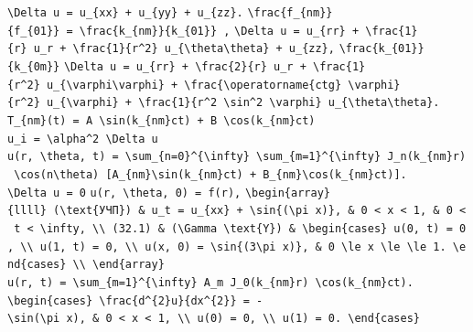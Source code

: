 \documentclass[
  ukrainian,
]{article}
\begin{document}
\texttt{\textbackslash{}Delta\ u\ =\ u\_\{xx\}\ +\ u\_\{yy\}\ +\ u\_\{zz\}.}
\texttt{\textbackslash{}frac\{f\_\{nm\}\}\{f\_\{01\}\}\ =\ \textbackslash{}frac\{k\_\{nm\}\}\{k\_\{01\}\}\ ,}
\texttt{\textbackslash{}Delta\ u\ =\ u\_\{rr\}\ +\ \textbackslash{}frac\{1\}\{r\}\ u\_r\ +\ \textbackslash{}frac\{1\}\{r\^{}2\}\ u\_\{\textbackslash{}theta\textbackslash{}theta\}\ +\ u\_\{zz\},}
\texttt{\textbackslash{}frac\{k\_\{01\}\}\{k\_\{0m\}\}}
\texttt{\textbackslash{}Delta\ u\ =\ u\_\{rr\}\ +\ \textbackslash{}frac\{2\}\{r\}\ u\_r\ +\ \textbackslash{}frac\{1\}\{r\^{}2\}\ u\_\{\textbackslash{}varphi\textbackslash{}varphi\}\ +\ \textbackslash{}frac\{\textbackslash{}operatorname\{ctg\}\ \textbackslash{}varphi\}\{r\^{}2\}\ u\_\{\textbackslash{}varphi\}\ +\ \textbackslash{}frac\{1\}\{r\^{}2\ \textbackslash{}sin\^{}2\ \textbackslash{}varphi\}\ u\_\{\textbackslash{}theta\textbackslash{}theta\}.}
\texttt{T\_\{nm\}(t)\ =\ A\ \textbackslash{}sin(k\_\{nm\}ct)\ +\ B\ \textbackslash{}cos(k\_\{nm\}ct)}
\texttt{u\_i\ =\ \textbackslash{}alpha\^{}2\ \textbackslash{}Delta\ u}
\texttt{u(r,\ \textbackslash{}theta,\ t)\ =\ \textbackslash{}sum\_\{n=0\}\^{}\{\textbackslash{}infty\}\ \textbackslash{}sum\_\{m=1\}\^{}\{\textbackslash{}infty\}\ J\_n(k\_\{nm\}r)\ \textbackslash{}cos(n\textbackslash{}theta)\ {[}A\_\{nm\}\textbackslash{}sin(k\_\{nm\}ct)\ +\ B\_\{nm\}\textbackslash{}cos(k\_\{nm\}ct){]}.}
\texttt{\textbackslash{}Delta\ u\ =\ 0}
\texttt{u(r,\ \textbackslash{}theta,\ 0)\ =\ f(r),}
\texttt{\textbackslash{}begin\{array\}\{llll\}\ (\textbackslash{}text\{УЧП\})\ \&\ u\_t\ =\ u\_\{xx\}\ +\ \textbackslash{}sin\{(\textbackslash{}pi\ x)\},\ \&\ 0\ \textless{}\ x\ \textless{}\ 1,\ \&\ 0\ \textless{}\ t\ \textless{}\ \textbackslash{}infty,\ \textbackslash{}\textbackslash{}\ (32.1)\ \&\ (\textbackslash{}Gamma\ \textbackslash{}text\{Y\})\ \&\ \textbackslash{}begin\{cases\}\ u(0,\ t)\ =\ 0,\ \textbackslash{}\textbackslash{}\ u(1,\ t)\ =\ 0,\ \textbackslash{}\textbackslash{}\ u(x,\ 0)\ =\ \textbackslash{}sin\{(3\textbackslash{}pi\ x)\},\ \&\ 0\ \textbackslash{}le\ x\ \textbackslash{}le\ \textbackslash{}le\ 1.\ \textbackslash{}end\{cases\}\ \textbackslash{}\textbackslash{}\ \textbackslash{}end\{array\}}
\texttt{u(r,\ t)\ =\ \textbackslash{}sum\_\{m=1\}\^{}\{\textbackslash{}infty\}\ A\_m\ J\_0(k\_\{nm\}r)\ \textbackslash{}cos(k\_\{nm\}ct).}
\texttt{\textbackslash{}begin\{cases\}\ \textbackslash{}frac\{d\^{}\{2\}u\}\{dx\^{}\{2\}\}\ =\ -\textbackslash{}sin(\textbackslash{}pi\ x),\ \&\ 0\ \textless{}\ x\ \textless{}\ 1,\ \textbackslash{}\textbackslash{}\ u(0)\ =\ 0,\ \textbackslash{}\textbackslash{}\ u(1)\ =\ 0.\ \textbackslash{}end\{cases\}}
\end{document}
